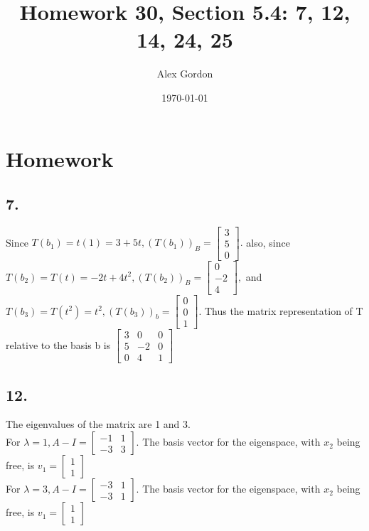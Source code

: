 \documentclass[12]{scrartcl}
\begin{document}
\title{Homework 30, Section 5.4: 7, 12, 14, 24, 25}
\author{Alex Gordon}
\date{\today}
\maketitle
\section*{Homework}
\subsection*{7.}
Since $T(b_1) = t(1) = 3 + 5t, (T(b_1))_B = \begin{bmatrix}  3 \\5 \\ 0  \end{bmatrix}.$ also, since $T(b_2) = T(t) = -2t + 4t^2, (T(b_2))_B = \begin{bmatrix}  0 \\-2 \\ 4  \end{bmatrix},$ and $T(b_3) = T(t^2) = t^2, (T(b_3))_b = \begin{bmatrix}  0 \\ 0 \\ 1  \end{bmatrix}$. Thus the matrix representation of T relative to the basis b is $\begin{bmatrix}  3 & 0 & 0  \\5 &-2 & 0 \\ 0 & 4 & 1 \end{bmatrix}$
\subsection*{12.} 
The eigenvalues of the matrix are 1 and 3. \\
For $\lambda = 1, A - I = \begin{bmatrix}  -1 & 1 \\ -3 & 3 \end{bmatrix}.$ The basis vector for the eigenspace, with $x_2$ being free, is $v_1 = \begin{bmatrix}  1\\1 \end{bmatrix}$\\
For $\lambda = 3, A - I = \begin{bmatrix}  -3 & 1 \\ -3 & 1 \end{bmatrix}.$ The basis vector for the eigenspace, with $x_2$ being free, is $v_1 = \begin{bmatrix}  1\\1 \end{bmatrix}$\\
\end{document}
